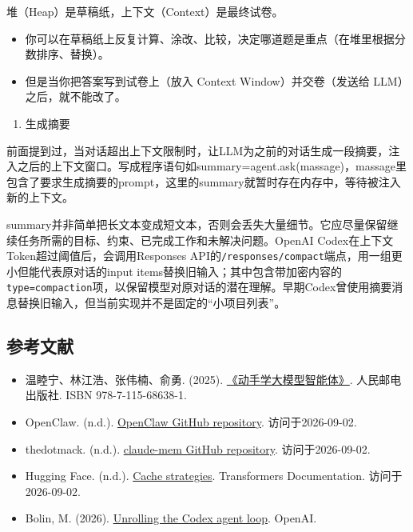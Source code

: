 堆（Heap）是草稿纸，上下文（Context）是最终试卷。

\begin{itemize}
\tightlist
\item
  你可以在草稿纸上反复计算、涂改、比较，决定哪道题是重点（在堆里根据分数排序、替换）。
\item
  但是当你把答案写到试卷上（放入 Context Window）并交卷（发送给 LLM）之后，就不能改了。
\end{itemize}

\begin{enumerate}
\def\labelenumi{\arabic{enumi}.}
\setcounter{enumi}{1}
\tightlist
\item
  生成摘要
\end{enumerate}

前面提到过，当对话超出上下文限制时，让LLM为之前的对话生成一段摘要，注入之后的上下文窗口。写成程序语句如summary=agent.ask(massage)，massage里包含了要求生成摘要的prompt，这里的summary就暂时存在内存中，等待被注入新的上下文。

summary并非简单把长文本变成短文本，否则会丢失大量细节。它应尽量保留继续任务所需的目标、约束、已完成工作和未解决问题。OpenAI Codex在上下文Token超过阈值后，会调用Responses API的\texttt{/responses/compact}端点，用一组更小但能代表原对话的input items替换旧输入；其中包含带加密内容的\texttt{type=compaction}项，以保留模型对原对话的潜在理解。早期Codex曾使用摘要消息替换旧输入，但当前实现并不是固定的``小项目列表''。

\hypertarget{ux53c2ux8003ux6587ux732e-126}{%
\subsection{参考文献}\label{ux53c2ux8003ux6587ux732e-126}}

\vspace{0.25em}
\begin{itemize}
\tightlist
\item
  温睦宁、林江浩、张伟楠、俞勇. (2025). \href{https://haa.boyuai.com/}{《动手学大模型智能体》}. 人民邮电出版社. ISBN 978-7-115-68638-1.
\item
  OpenClaw. (n.d.). \href{https://github.com/openclaw/openclaw}{OpenClaw GitHub repository}. 访问于2026-09-02.
\item
  thedotmack. (n.d.). \href{https://github.com/thedotmack/claude-mem}{claude-mem GitHub repository}. 访问于2026-09-02.
\item
  Hugging Face. (n.d.). \href{https://huggingface.co/docs/transformers/main/kv_cache}{Cache strategies}. Transformers Documentation. 访问于2026-09-02.
\item
  Bolin, M. (2026). \href{https://openai.com/index/unrolling-the-codex-agent-loop/}{Unrolling the Codex agent loop}. OpenAI.
\end{itemize}

